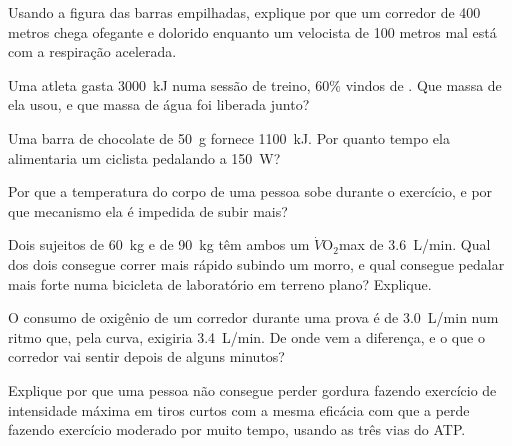 \begin{exercise}[$\star\star$]\label{exo:g10:exercise-and-energy:8}
Usando a figura das barras empilhadas, explique por que um corredor de
400 metros chega ofegante e dolorido enquanto um velocista de 100
metros mal está com a respiração acelerada.
\end{exercise}

\begin{exercise}[$\star\star$]\label{exo:g10:exercise-and-energy:9}
Uma atleta gasta \qty{3000}{kJ} numa sessão de treino, 60\% vindos de
. Que massa de  ela usou, e que massa de água foi
liberada junto?
\end{exercise}

\begin{exercise}[$\star\star$]\label{exo:g10:exercise-and-energy:10}
Uma barra de chocolate de \qty{50}{g} fornece \qty{1100}{kJ}. Por
quanto tempo ela alimentaria um ciclista pedalando a \qty{150}{W}?
\end{exercise}

\begin{exercise}[$\star\star$]\label{exo:g10:exercise-and-energy:11}
Por que a temperatura do corpo de uma pessoa sobe durante o exercício,
e por que mecanismo ela é impedida de subir mais?
\end{exercise}

\begin{exercise}[$\star\star\star$]\label{exo:g10:exercise-and-energy:12}
Dois sujeitos de \qty{60}{kg} e de \qty{90}{kg} têm ambos um
$\dot V\!\mathrm{O_2}$max de \qty{3.6}{L/min}. Qual dos dois consegue
correr mais rápido subindo um morro, e qual consegue pedalar mais
forte numa bicicleta de laboratório em terreno plano? Explique.
\end{exercise}

\begin{exercise}[$\star\star\star$]\label{exo:g10:exercise-and-energy:13}
O consumo de oxigênio de um corredor durante uma prova é de
\qty{3.0}{L/min} num ritmo que, pela curva, exigiria \qty{3.4}{L/min}.
De onde vem a diferença, e o que o corredor vai sentir depois de alguns
minutos?
\end{exercise}

\begin{exercise}[$\star\star\star$]\label{exo:g10:exercise-and-energy:14}
Explique por que uma pessoa não consegue perder gordura fazendo
exercício de intensidade máxima em tiros curtos com a mesma eficácia
com que a perde fazendo exercício moderado por muito tempo, usando as
três vias do ATP.
\end{exercise}

